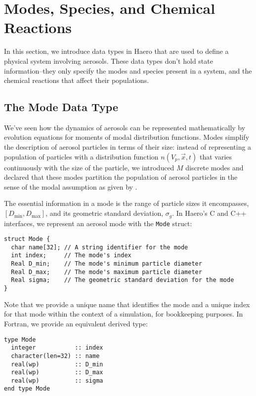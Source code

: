 \section{Modes, Species, and Chemical Reactions}

In this section, we introduce data types in Haero that are used to define a
physical system involving aerosols. These data types don't hold state
information--they only specify the modes and species present in a system,
and the chemical reactions that affect their populations.

\subsection{The Mode Data Type}

We've seen how the dynamics of aerosols can be represented mathematically
by evolution equations for moments of modal distribution functions. Modes
simplify the description of aerosol particles in terms of their size: instead of
representing a population of particles with a distribution function
$n(V_p, \vec{x}, t)$ that varies continuously with the size of the particle, we
introduced $M$ discrete modes and declared that these modes partition the
population of aerosol particles in the sense of the modal assumption as given
by .

The essential information in a mode is the range of particle sizes it
encompasses, $[D_{\min}, D_{\max}]$, and its geometric standard deviation,
$\sigma_g$. In Haero's C and C++ interfaces,
we represent an aerosol mode with the \verb|Mode| struct:

\begin{verbatim}
struct Mode {
  char name[32]; // A string identifier for the mode
  int index;     // The mode's index
  Real D_min;    // The mode's minimum particle diameter
  Real D_max;    // The mode's maximum particle diameter
  Real sigma;    // The geometric standard deviation for the mode
}
\end{verbatim}

Note that we provide a unique name that identifies the mode and a unique
index for that mode within the context of a simulation, for bookkeeping
purposes. In Fortran, we provide an equivalent derived type:

\begin{verbatim}
type Mode
  integer           :: index
  character(len=32) :: name
  real(wp)          :: D_min
  real(wp)          :: D_max
  real(wp)          :: sigma
end type Mode
\end{verbatim}

